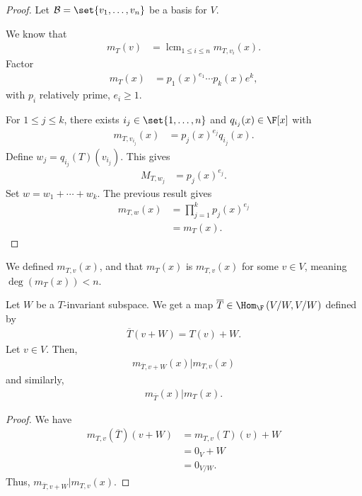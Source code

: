 \documentclass[10pt]{mypackage}
\DeclareMathOperator*{\lcm}{lcm}
\begin{document}
\begin{proof}
  Let $\mathcal{B} = \set{v_1,\dots,v_n}$ be a basis for $V$.\newline

  We know that
  \begin{align*}
    m_{T}\left(v\right) &= \lcm_{1 \leq i \leq n} m_{T,v_i}(x).
  \end{align*}
  Factor
  \begin{align*}
    m_T(x) &= p_1(x)^{e_1} \cdots p_{k}(x)e^{k},
  \end{align*}
  with $p_i$ relatively prime, $e_i \geq 1$.\newline

  For $1 \leq j \leq k$, there exists $i_j\in \set{1,\dots,n}$ and $q_{i_j}(x)\in \F[x]$ with
  \begin{align*}
    m_{T,v_{i_j}}(x) &= p_j(x)^{e_j}q_{i_j}(x).
  \end{align*}
  Define $w_j = q_{i_j}(T)\left(v_{i_j}\right)$. This gives
  \begin{align*}
    M_{T,w_j} &= p_j(x)^{e_j}.
  \end{align*}
  Set $w = w_1 + \cdots + w_k$. The previous result gives
  \begin{align*}
    m_{T,w}(x) &= \prod_{j=1}^{k}p_j(x)^{e_j}\\
               &= m_T(x).
  \end{align*}
\end{proof}
\begin{recall}
  We defined $m_{T,v}(x)$, and that $m_T(x)$ is $m_{T,v}(x)$ for some $v\in V$, meaning $\deg\left(m_T(x)\right) < n$.
\end{recall}
\begin{lemma}
  Let $W$ be a $T$-invariant subspace. We get a map $\overline{T}\in\Hom_{\F}\left(V/W,V/W\right)$ defined by
  \begin{align*}
    \overline{T}\left(v+W\right) = T(v) + W.
  \end{align*}
  Let $v\in V$. Then,
  \begin{align*}
    m_{\overline{T},v+W}(x)|m_{T,v}(x)
  \end{align*}
  and similarly,
  \begin{align*}
    m_{\overline{T}}(x) | m_T(x).
  \end{align*}
\end{lemma}
\begin{proof}
  We have
  \begin{align*}
    m_{T,v}\left(\overline{T}\right)\left(v+W\right) &= m_{T,v}\left(T\right)(v) + W\\
                                                     &= 0_V + W\\
                                                     &= 0_{V/W}.
  \end{align*}
  Thus, $m_{\overline{T},v+W}|m_{T,v}(x)$.
\end{proof}
\end{document}
